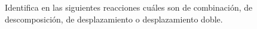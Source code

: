 Identifica en las siguientes reacciones cuáles son de combinación, de descomposición, de desplazamiento o desplazamiento doble.

\begin{multicols}{2}
    \begin{parts}
        \part 
        \part 
        \part 
        \part 
    \end{parts}
\end{multicols}